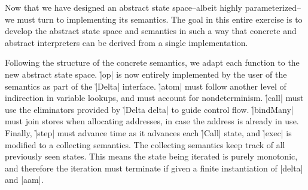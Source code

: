 Now that we have designed an abstract state space--albeit highly
parameterized--we must turn to implementing its semantics.
%
The goal in this entire exercise is to develop the abstract state space and
semantics in such a way that concrete and abstract interpreters can be derived
from a single implementation.


Following the structure of the concrete semantics, we adapt each function to
the new abstract state space.
%
\h|op| is now entirely implemented by the user of the semantics as part of the
\h|Delta| interface.
%
\h|atom| must follow another level of indirection in variable lookups, and must
account for nondeterminism.
%
%
\h|call| must use the eliminators provided by \h|Delta delta| to guide control
flow.
%
%
\h|bindMany| must join stores when allocating addresses, in case the address is
already in use.
%
%
Finally, \h|step| must advance time as it advances each \h|Call| state, and
\h|exec| is modified to a collecting semantics.
%
%
The collecting semantics keep track of all previously seen states.
%
This means the state being iterated is purely monotonic, and therefore the
iteration must terminate if given a finite instantiation of \p|delta| and
\p|aam|.
